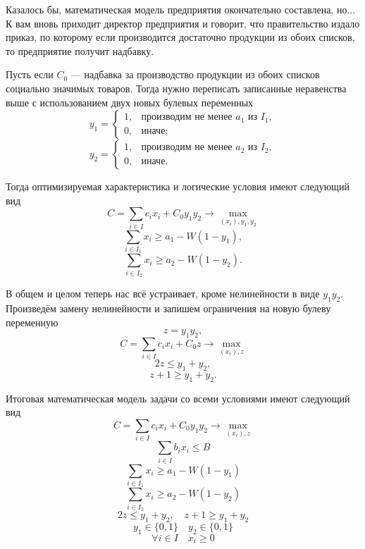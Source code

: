 Казалось бы, математическая модель предприятия окончательно составлена, но... К вам вновь приходит директор предприятия и говорит, что правительство издало приказ, по которому если производится достаточно продукции из обоих списков, то предприятие получит надбавку.

Пусть если $C_0$ --- надбавка за производство продукции из обоих списков социально значимых товаров. Тогда нужно переписать записанные неравенства выше с использованием двух новых булевых переменных
\[
y_1 = \begin{cases}
	1, & \text{производим не менее $a_1$ из $I_1$}, \\
	0, & \text{иначе};
\end{cases}
\]
\[
y_2 = \begin{cases}
	1, & \text{производим не менее $a_2$ из $I_2$}, \\
	0, & \text{иначе}.
\end{cases}
\]

Тогда оптимизируемая характеристика и логические условия имеют следующий вид
\[
C = \sum_{i \in I}c_i x_i + C_0 y_1 y_2 \to \max_{(x_i), y_1, y_2}
\]
\[
\sum_{i \in I_1} x_i \ge a_1 - W(1 - y_1),
\]
\[
\sum_{i \in I_2} x_i \ge a_2 - W(1 - y_2).
\]

В общем и целом теперь нас всё устраивает, кроме нелинейности в виде $y_1 y_2$. Произведём замену нелинейности и запишем ограничения на новую булеву переменную
\[
z = y_1 y_2,
\]
\[
C = \sum_{i \in I}c_i x_i + C_0 z \to \max_{(x_i), z}
\]
\[
2z \le y_1 + y_2,
\]
\[
z + 1 \ge y_1 + y_2.
\]

Итоговая математическая модель задачи со всеми условиями имеют следующий вид
\[
C = \sum_{i \in I}c_i x_i + C_0 y_1 y_2 \to \max_{(x_i), z}
\]
\[
\sum_{i \in I}b_i x_i \le B
\]
\[
\sum_{i \in I_1} x_i \ge a_1 - W(1 - y_1)
\]
\[
\sum_{i \in I_2} x_i \ge a_2 - W(1 - y_2)
\]
\[
2z \le y_1 + y_2, \quad z + 1 \ge y_1 + y_2
\]
\[
y_1 \in \{0, 1\} \quad y_2 \in \{0, 1\}
\]
\[
\forall i \in I \quad x_i \ge 0
\]
